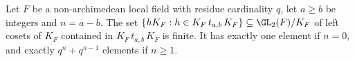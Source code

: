 Let $F$ be a non-archimedean local field with residue cardinality $q$, let $a\ge b$ be integers and $n=a-b$. The set
$\{hK_F:h\in K_F\,t_{a,b}\,K_F\}\subseteq\GL_2(F)/K_F$ of left cosets of $K_F$ contained in $K_F\,t_{a,b}\,K_F$ is
finite. It has exactly one element if $n=0$, and exactly $q^n+q^{n-1}$ elements if $n\ge1$.
